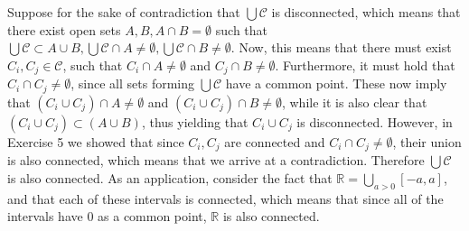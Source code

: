 \begin{solution}
    
    Suppose for the sake of contradiction that $\bigcup \mathcal{C}$ is disconnected, which means that there exist open sets $A, B, A \cap B = \emptyset$ such that $\bigcup \mathcal{C} \subset A \cup B, \bigcup \mathcal{C} \cap A \neq \emptyset, \bigcup \mathcal{C} \cap B \neq \emptyset$.
    Now, this means that there must exist $C_i, C_j \in \mathcal{C}$, such that $C_i \cap A \neq \emptyset$ and $C_j \cap B \neq \emptyset$.
    Furthermore, it must hold that $C_i \cap C_j \neq \emptyset$, since all sets forming $\bigcup \mathcal{C}$ have a common point.
    These now imply that $(C_i \cup C_j) \cap A \neq \emptyset$ and $(C_i \cup C_j) \cap B \neq \emptyset$, while it is also clear that $(C_i \cup C_j) \subset (A \cup B)$, thus yielding that $C_i \cup C_j$ is disconnected.
    However, in Exercise 5 we showed that since $C_i, C_j$ are connected and $C_i \cap C_j \neq \emptyset$, their union is also connected, which means that we arrive at a contradiction.
    Therefore $\bigcup \mathcal{C}$ is also connected.
    As an application, consider the fact that $\mathbb{R} = \bigcup_{a > 0} [-a, a]$, and that each of these intervals is connected, which means that since all of the intervals have 0 as a common point, $\mathbb{R}$ is also connected.

\end{solution}